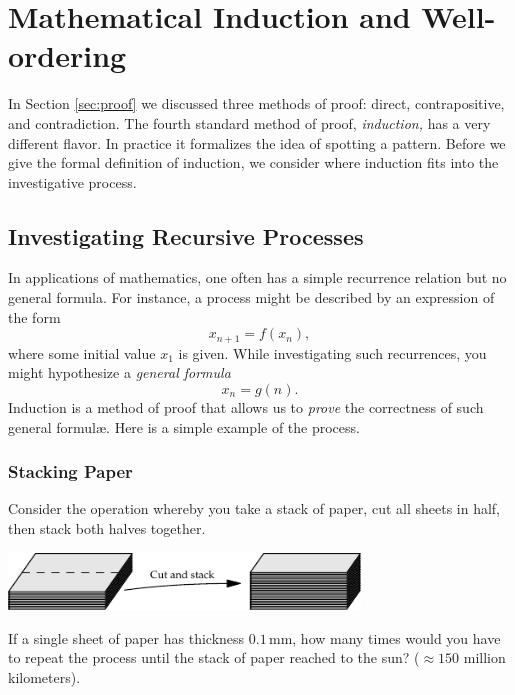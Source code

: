 \graphicspath{{notes/5induction/}}
\section{Mathematical Induction and Well-ordering}\label{sec:ind}

In Section \ref{sec:proof} we discussed three methods of proof: direct, contrapositive, and contradiction. The fourth standard method of proof, \emph{induction,} has a very different flavor. In practice it formalizes the idea of spotting a pattern. Before we give the formal definition of induction, we consider where induction fits into the investigative process.

\subsection{Investigating Recursive Processes}

In applications of mathematics, one often has a simple recurrence relation but no general formula. For instance, a process might be described by an expression of the form
\[x_{n+1}=f(x_n),\]
where some initial value $x_1$ is given. While investigating such recurrences, you might hypothesize a \emph{general formula}
\[x_n=g(n).\]
Induction is a method of proof that allows us to \emph{prove} the correctness of such general formulæ. Here is a simple example of the process.

\subsubsection*{Stacking Paper}

Consider the operation whereby you take a stack of paper, cut all sheets in half, then stack both halves together.
\begin{center}
\includegraphics[width=0.7\textwidth]{induction-02-paper}
\end{center}
If a single sheet of paper has thickness $0.1$\,mm, how many times would you have to repeat the process until the stack of paper reached to the sun? ($\approx 150$ million kilometers).\\

